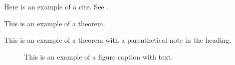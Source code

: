 Here is an example of a cite. See \cite{Aoki}. \cite{Ao}

\begin{theorem}
This is an example of a theorem.
\end{theorem}

\begin{theorem}
This is an example of a theorem with a parenthetical note in the
heading.
\end{theorem}

\begin{figure}[tb]
\caption{This is an example of a figure caption with text.}
\label{firstfig}
\end{figure}

\begin{figure}[tb]
\caption{}\label{otherfig}
\end{figure}





